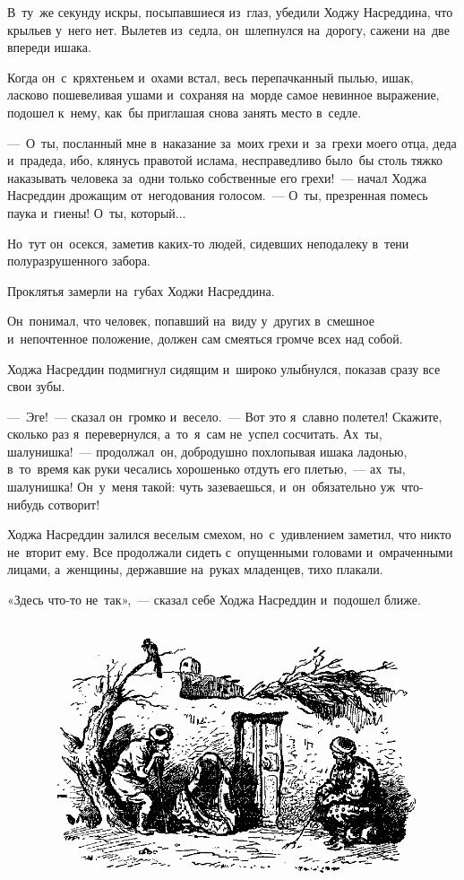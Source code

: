 \documentclass[12pt,a4paper]{book}
\begin{document}
В~ту~же секунду искры, посыпавшиеся из~глаз, убедили Ходжу Насреддина, что крыльев у~него нет. Вылетев из~седла, он~шлепнулся на~дорогу, сажени на~две впереди ишака.

Когда он~с~кряхтеньем и~охами встал, весь перепачканный пылью, ишак, ласково пошевеливая ушами и~сохраняя на~морде самое невинное выражение, подошел к~нему, как~бы приглашая снова занять место в~седле.

—~О~ты, посланный мне в~наказание за~моих грехи и~за~грехи моего отца, деда и~прадеда, ибо, клянусь правотой ислама, несправедливо было~бы столь тяжко наказывать человека за~одни только собственные его грехи!~— начал Ходжа Насреддин дрожащим от~негодования голосом.~— О~ты, презренная помесь паука и~гиены! О~ты, который...

Но~тут он~осекся, заметив каких-то людей, сидевших неподалеку в~тени полуразрушенного забора.

Проклятья замерли на~губах Ходжи Насреддина.

Он~понимал, что человек, попавший на~виду у~других в~смешное и~непочтенное положение, должен сам смеяться громче всех над собой.

Ходжа Насреддин подмигнул сидящим и~широко улыбнулся, показав сразу все свои зубы.

—~Эге!~— сказал он~громко и~весело.~— Вот это я~славно полетел! Скажите, сколько раз я~перевернулся, а~то~я~сам не~успел сосчитать. Ах~ты, шалунишка!~— продолжал~он, добродушно похлопывая ишака ладонью, в~то~время как руки чесались хорошенько отдуть его плетью,~— ах~ты, шалунишка! Он~у~меня такой: чуть зазеваешься, и~он~обязательно уж~что-нибудь сотворит!

Ходжа Насреддин залился веселым смехом, но~с~удивлением заметил, что никто не~вторит ему. Все продолжали сидеть с~опущенными головами и~омраченными лицами, а~женщины, державшие на~руках младенцев, тихо плакали.

«Здесь что-то не~так»,~— сказал себе Ходжа Насреддин и~подошел ближе.

\begin{figure}[h]
\centering
\includegraphics[width=\textwidth]{3.png}
\end{figure}
\end{document}
